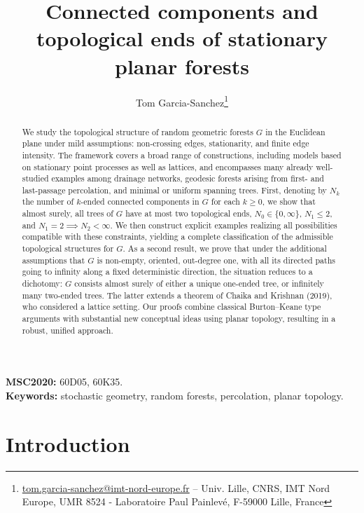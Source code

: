 \documentclass[a4paper, 11pt]{article} %
\theoremstyle{plain}
\newcommand{\1}{\mathds 1}
\numberwithin{equation}{section}
\begin{document}
\title{Connected components and topological ends of stationary planar forests}
\author{Tom Garcia-Sanchez\footnote{\href{mailto:tom.garcia-sanchez@imt-nord-europe.fr}{tom.garcia-sanchez@imt-nord-europe.fr} -- Univ. Lille, CNRS, IMT Nord Europe, UMR 8524 - Laboratoire Paul Painlevé, F-59000 Lille, France}}


\maketitle


\begin{abstract}
    We study the topological structure of random geometric forests $G$ in the Euclidean plane under mild assumptions: non-crossing edges, stationarity, and finite edge intensity. The framework covers a broad range of constructions, including models based on stationary point processes as well as lattices, and encompasses many already well-studied examples among drainage networks, geodesic forests arising from first- and last-passage percolation, and minimal or uniform spanning trees. First, denoting by $N_k$ the number of $k$-ended connected components in $G$ for each $k\geq0$, we show that almost surely, all trees of $G$ have at most two topological ends, $N_0\in\{0,\infty\}$, $N_1\leq2$, and $N_1=2\implies N_2<\infty$. We then construct explicit examples realizing all possibilities compatible with these constraints, yielding a complete classification of the admissible topological structures for $G$. As a second result, we prove that under the additional assumptions that $G$ is non-empty, oriented, out-degree one, with all its directed paths going to infinity along a fixed deterministic direction, the situation reduces to a dichotomy: $G$ consists almost surely of either a unique one-ended tree, or infinitely many two-ended trees. The latter extends a theorem of Chaika and Krishnan (2019), who considered a lattice setting. Our proofs combine classical Burton--Keane type arguments with substantial new conceptual ideas using planar topology, resulting in a robust, unified approach. 
\end{abstract}


\noindent\textbf{MSC2020:} 60D05, 60K35.\\
\textbf{Keywords:} stochastic geometry, random forests, percolation, planar topology.


\section{Introduction}
\end{document}
